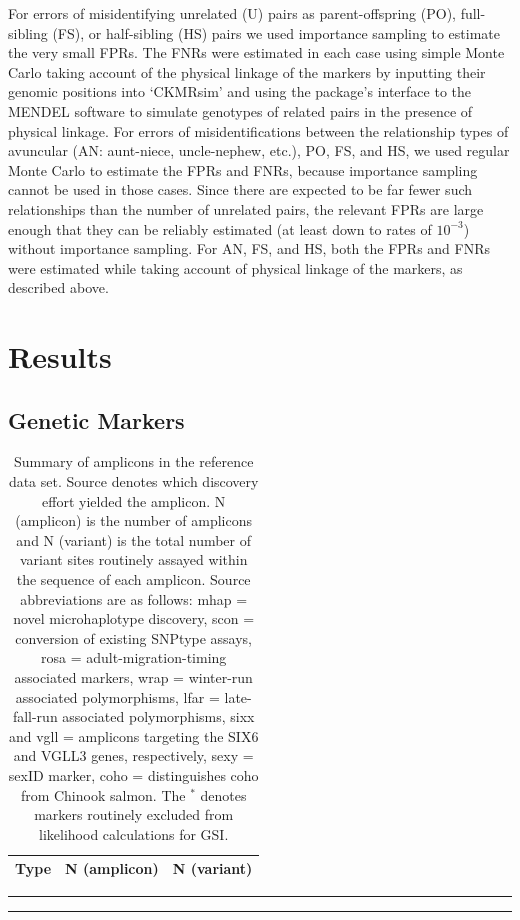 For errors of misidentifying
unrelated (U) pairs as parent-offspring (PO), full-sibling (FS), or half-sibling (HS)
pairs we used importance sampling to estimate the very small FPRs.  The
FNRs were estimated in each case using simple Monte Carlo taking account
of the physical linkage of the markers by inputting their genomic positions into
`CKMRsim' and using the package's interface to the MENDEL \citep{lange2013mendel}
software to simulate genotypes of related pairs
in the presence of physical linkage.  
For errors of misidentifications between the relationship
types of avuncular (AN: aunt-niece, uncle-nephew, etc.), PO, FS, and HS,
we used regular Monte Carlo to estimate the FPRs and FNRs, because
importance sampling cannot be used in those cases. Since there are
expected to be far fewer such relationships than the number of unrelated
pairs, the relevant FPRs are large enough that they can be reliably estimated
(at least down to rates of $10^{-3}$) without importance sampling.
For AN, FS, and HS, both the
FPRs and FNRs were estimated while taking account of physical linkage
of the markers, as described above.

\section*{Results}

\subsection*{Genetic Markers}

\begin{table}
\caption{\footnotesize  Summary of amplicons in the reference data set.  Source denotes
which discovery effort yielded the amplicon. N (amplicon) is the number of amplicons
and N (variant) is the total number of variant sites routinely assayed within the sequence of each
amplicon.  Source abbreviations are as follows: mhap = novel microhaplotype discovery, scon = conversion of existing SNPtype
assays, rosa = adult-migration-timing associated markers, wrap = winter-run associated
polymorphisms, lfar = late-fall-run associated polymorphisms, sixx and vgll = amplicons
targeting the SIX6 and VGLL3 genes, respectively, sexy = sexID marker, coho =
distinguishes coho from Chinook salmon. The $^*$ denotes markers routinely
excluded from likelihood calculations for GSI.}
\label{tab:loci-summ}
{
\begin{tabular*}{0.48\textwidth}{@{\extracolsep{\fill}} lrr}
\hline\hline
Type&N (amplicon)&N (variant)\tabularnewline
\hline

\end{tabular*}
}
\vspace*{-2.3ex}\hrule width0.48\textwidth
\vspace*{0.3ex}\hrule width0.48\textwidth
\end{table}

